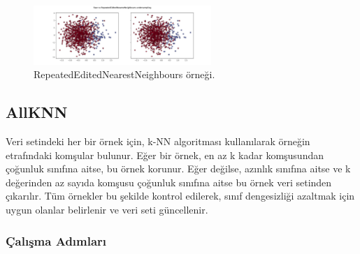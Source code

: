 \begin{figure}[h]
    \centering
    \includegraphics[width=0.6\textwidth]{images/Raw vs RepeatedEditedNearestNeighbours undersampling.png}
    \caption{RepeatedEditedNearestNeighbours örneği.}
    \label{fig:enter-label}
\end{figure}

\newpage

\subsection{AllKNN}
Veri setindeki her bir örnek için, k-NN algoritması kullanılarak örneğin etrafındaki komşular bulunur. Eğer bir örnek, en az k kadar komşusundan çoğunluk sınıfına aitse, bu örnek korunur. Eğer değilse, azınlık sınıfına aitse ve k değerinden az sayıda komşusu çoğunluk sınıfına aitse bu örnek veri setinden çıkarılır. Tüm örnekler bu şekilde kontrol edilerek, sınıf dengesizliği azaltmak için uygun olanlar belirlenir ve veri seti güncellenir.

\subsubsection{Çalışma Adımları}

